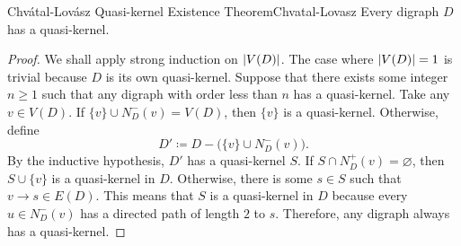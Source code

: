 \documentclass[math, code]{amznotes}
\theoremstyle{remark}
\begin{document}
\begin{thmbox}{Chv\'{a}tal-Lov\'{a}sz Quasi-kernel Existence Theorem}{Chvatal-Lovasz}
    Every digraph $D$ has a quasi-kernel.
    \tcblower
    \begin{proof}
        We shall apply strong induction on ${\left\lvert {V(D)} \right\rvert}$. The case where ${\left\lvert {V(D)} \right\rvert} = 1$ is trivial because $D$ is its own quasi-kernel. Suppose that there exists some integer $n \geq 1$ such that any digraph with order less than $n$ has a quasi-kernel. Take any $v \in V(D)$. If $\{v\} \cup N_D^-(v) = V(D)$, then $\{v\}$ is a quasi-kernel. Otherwise, define 
        \begin{equation*}
            D' \coloneqq D - \bigl(\{v\} \cup N_D^-(v)\bigr).
        \end{equation*}
        By the inductive hypothesis, $D'$ has a quasi-kernel $S$. If $S \cap N_D^+(v) = \varnothing$, then $S \cup \{v\}$ is a quasi-kernel in $D$. Otherwise, there is some $s \in S$ such that $v \to s \in E(D)$. This means that $S$ is a quasi-kernel in $D$ because every $u \in N_D^-(v)$ has a directed path of length $2$ to $s$. Therefore, any digraph always has a quasi-kernel.
    \end{proof}
\end{thmbox}
\end{document}
